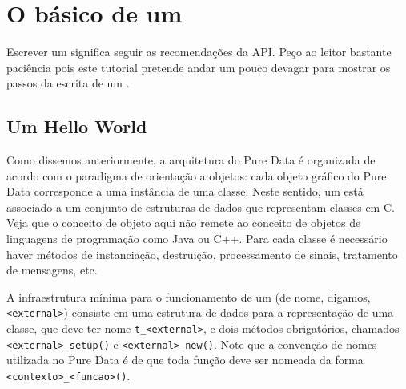 
\chapter{O básico de um \external}


Escrever um \external significa seguir as recomendações da API. Peço ao leitor
bastante paciência pois este tutorial pretende andar um pouco devagar para
mostrar os passos da escrita de um \external.


\section{Um \external Hello World}

Como dissemos anteriormente, a arquitetura do Pure Data é organizada de acordo
com o paradigma de orientação a objetos: cada objeto gráfico do Pure Data
corresponde a uma instância de uma classe. Neste sentido, um \external está
associado a um conjunto de estruturas de dados que representam classes em C.
Veja que o conceito de objeto aqui não remete ao conceito de objetos de
linguagens de programação como Java ou C++.
Para cada classe é necessário haver métodos de instanciação, destruição,
processamento de sinais, tratamento de mensagens, etc.

A infraestrutura mínima para o funcionamento de um \external (de nome, digamos,
\texttt{<external>}) consiste em uma estrutura de dados para a representação
de uma classe, que deve ter nome \texttt{t\_<external>}, e dois métodos
obrigatórios, chamados \texttt{<external>\_setup()} e
\texttt{<external>\_new()}. Note que a convenção de nomes utilizada no Pure
Data é de que toda função deve ser nomeada da forma
\texttt{<contexto>\_<funcao>()}.

